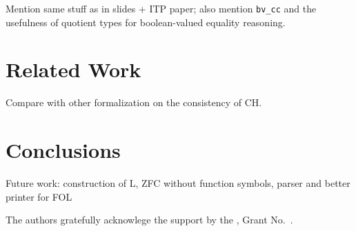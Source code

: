 \documentclass[sigplan,10pt,review, anonymous]{acmart}
\theoremstyle{definition}
\begin{document}
Mention same stuff as in slides + ITP paper; also mention \lstinline{bv_cc} and the usefulness of quotient types for boolean-valued equality reasoning.

\section{Related Work}
\label{section:related-work}
Compare with other formalization on the consistency of CH.

\section{Conclusions}
\label{section:conclusions}
Future work: construction of L, ZFC without function symbols, parser and better printer for FOL

\begin{acks}                            %
  The authors gratefully acknowlege the support by the
  , Grant
  No.~.
\end{acks}




\end{document}
